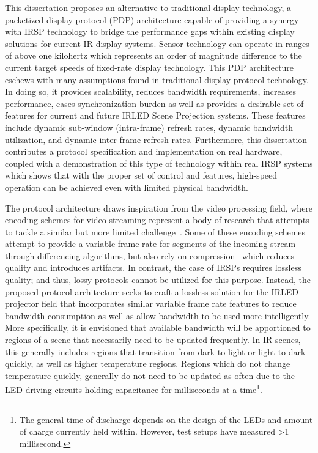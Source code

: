 This dissertation proposes an alternative to traditional display technology, a packetized display protocol (PDP) architecture capable of providing a synergy with IRSP technology to bridge the performance gaps within existing display solutions for current IR display systems. Sensor technology can operate in ranges of above one kilohertz which represents an order of magnitude difference to the current target speeds of fixed-rate display technology. This PDP architecture eschews with many assumptions found in traditional display protocol technology. In doing so, it provides scalability, reduces bandwidth requirements, increases performance, eases synchronization burden as well as provides a desirable set of features for current and future IRLED Scene Projection systems. These features include dynamic sub-window (intra-frame) refresh rates, dynamic bandwidth utilization, and dynamic inter-frame refresh rates. Furthermore, this dissertation contributes a protocol specification and implementation on real hardware, coupled with a demonstration of this type of technology within real IRSP systems which shows that with the proper set of control and features, high-speed operation can be achieved even with limited physical bandwidth.

The protocol architecture draws inspiration from the video processing field, where encoding schemes for video streaming represent a body of research that attempts to tackle a similar but more limited challenge~\cite{BakarEtAl2017}. Some of these encoding schemes attempt to provide a variable frame rate for segments of the incoming stream through differencing algorithms, but also rely on compression~\cite{CastilloEtAl2012} which reduces quality and introduces artifacts. In contrast, the case of IRSPs requires lossless quality; and thus, lossy protocols cannot be utilized for this purpose. Instead, the proposed protocol architecture seeks to craft a lossless solution for the IRLED projector field that incorporates similar variable frame rate features to reduce bandwidth consumption as well as allow bandwidth to be used more intelligently. More specifically, it is envisioned that available bandwidth will be apportioned to regions of a scene that necessarily need to be updated frequently. In IR scenes, this generally includes regions that transition from dark to light or light to dark quickly, as well as higher temperature regions. Regions which do not change temperature quickly, generally do not need to be updated as often due to the LED driving circuits holding capacitance for milliseconds at a time\footnote{The general time of discharge depends on the design of the LEDs and amount of charge currently held within. However, test setups have measured \textgreater1 millisecond.}.

